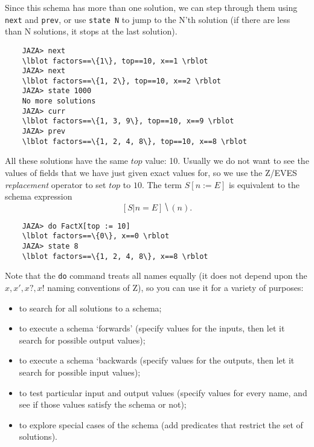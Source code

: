 \documentclass[11pt]{article}
\begin{document}
Since this schema has more than one solution, we can step through them
using \verb!next! and \verb!prev!, or use \verb!state N! to jump
to the N'th solution (if there are less than N solutions, it stops
at the last solution).
\begin{verbatim}
    JAZA> next
    \lblot factors==\{1\}, top==10, x==1 \rblot
    JAZA> next
    \lblot factors==\{1, 2\}, top==10, x==2 \rblot
    JAZA> state 1000
    No more solutions
    JAZA> curr
    \lblot factors==\{1, 3, 9\}, top==10, x==9 \rblot
    JAZA> prev
    \lblot factors==\{1, 2, 4, 8\}, top==10, x==8 \rblot
\end{verbatim}

All these solutions have the same $top$ value: 10.
Usually we do not want to see the values of fields that we have
just given exact values for, so we use the Z/EVES \emph{replacement}
operator to set $top$ to $10$.  The term $S[n := E]$ is equivalent
to the schema expression
\[
    [S | n = E] \hide (n).
\]

\begin{verbatim}
    JAZA> do FactX[top := 10]
    \lblot factors==\{0\}, x==0 \rblot
    JAZA> state 8
    \lblot factors==\{1, 2, 4, 8\}, x==8 \rblot
\end{verbatim}

Note that 
the \verb!do! command treats all names equally (it does not depend upon the
$x, x', x?, x!$ naming conventions of Z), so you can use it for a variety
of purposes:
\begin{itemize}
\item to search for all solutions to a schema;
\item to execute a schema `forwards' (specify values for the inputs, then let
  it search for possible output values);
\item to execute a schema `backwards (specify values for the outputs, then
  let it search for possible input values);
\item to test particular input and output values (specify values for 
  every name, and see if those values satisfy the schema or not);
\item to explore special cases of the schema (add predicates that
  restrict the set of solutions).
\end{itemize}
\end{document}
